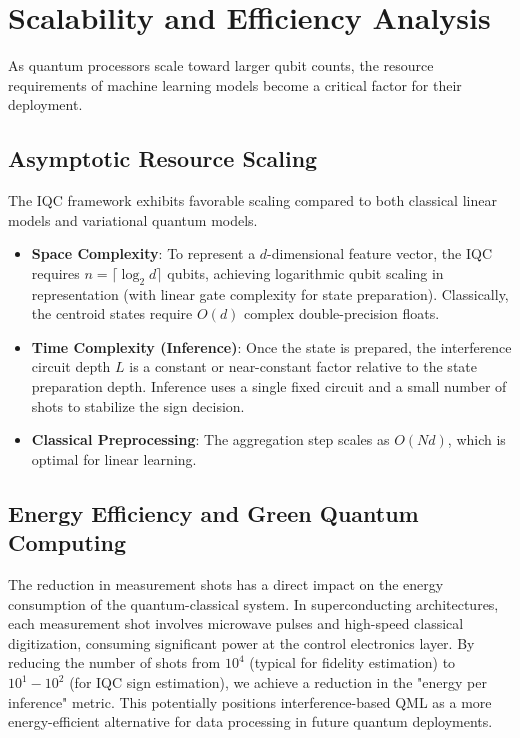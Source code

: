 \documentclass[conference]{IEEEtran}
\begin{document}
\section{Scalability and Efficiency Analysis}

As quantum processors scale toward larger qubit counts, the resource requirements of machine learning models become a critical factor for their deployment.

\subsection{Asymptotic Resource Scaling}

The IQC framework exhibits favorable scaling compared to both classical linear models and variational quantum models. 
\begin{itemize}
    \item \textbf{Space Complexity}: To represent a $d$-dimensional feature vector, the IQC requires $n = \lceil \log_2 d \rceil$ qubits, achieving logarithmic qubit scaling in representation (with linear gate complexity for state preparation). Classically, the centroid states require $O(d)$ complex double-precision floats.
    \item \textbf{Time Complexity (Inference)}: Once the state is prepared, the interference circuit depth $L$ is a constant or near-constant factor relative to the state preparation depth. Inference uses a single fixed circuit and a small number of shots to stabilize the sign decision.
    \item \textbf{Classical Preprocessing}: The aggregation step scales as $O(Nd)$, which is optimal for linear learning.
\end{itemize}

\subsection{Energy Efficiency and Green Quantum Computing}

The reduction in measurement shots has a direct impact on the energy consumption of the quantum-classical system. In superconducting architectures, each measurement shot involves microwave pulses and high-speed classical digitization, consuming significant power at the control electronics layer. By reducing the number of shots from $10^4$ (typical for fidelity estimation) to $10^1-10^2$ (for IQC sign estimation), we achieve a reduction in the "energy per inference" metric. This potentially positions interference-based QML as a more energy-efficient alternative for data processing in future quantum deployments.
\end{document}
